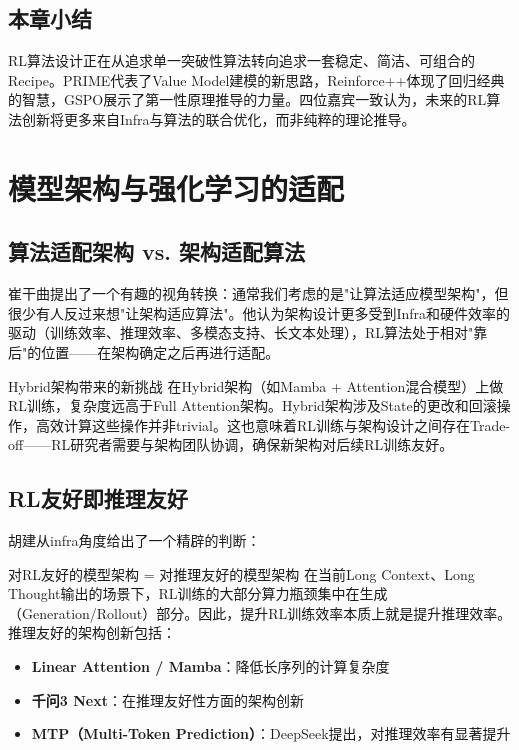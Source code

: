 \documentclass[a4paper]{article}
\begin{document}
\subsection{本章小结}

RL算法设计正在从追求单一突破性算法转向追求一套稳定、简洁、可组合的Recipe。PRIME代表了Value Model建模的新思路，Reinforce++体现了回归经典的智慧，GSPO展示了第一性原理推导的力量。四位嘉宾一致认为，未来的RL算法创新将更多来自Infra与算法的联合优化，而非纯粹的理论推导。


\section{模型架构与强化学习的适配}

\subsection{算法适配架构 vs. 架构适配算法}

崔干曲提出了一个有趣的视角转换：通常我们考虑的是"让算法适应模型架构"，但很少有人反过来想"让架构适应算法"。他认为架构设计更多受到Infra和硬件效率的驱动（训练效率、推理效率、多模态支持、长文本处理），RL算法处于相对"靠后"的位置——在架构确定之后再进行适配。

\begin{warningbox}{Hybrid架构带来的新挑战}
在Hybrid架构（如Mamba + Attention混合模型）上做RL训练，复杂度远高于Full Attention架构。Hybrid架构涉及State的更改和回滚操作，高效计算这些操作并非trivial。这也意味着RL训练与架构设计之间存在Trade-off——RL研究者需要与架构团队协调，确保新架构对后续RL训练友好。
\end{warningbox}

\subsection{RL友好即推理友好}

胡建从infra角度给出了一个精辟的判断：

\begin{importantbox}{对RL友好的模型架构 = 对推理友好的模型架构}
在当前Long Context、Long Thought输出的场景下，RL训练的大部分算力瓶颈集中在生成（Generation/Rollout）部分。因此，提升RL训练效率本质上就是提升推理效率。推理友好的架构创新包括：
\begin{itemize}
    \item \textbf{Linear Attention / Mamba}：降低长序列的计算复杂度
    \item \textbf{千问3 Next}：在推理友好性方面的架构创新
    \item \textbf{MTP（Multi-Token Prediction）}：DeepSeek提出，对推理效率有显著提升
\end{itemize}
\end{importantbox}
\end{document}
